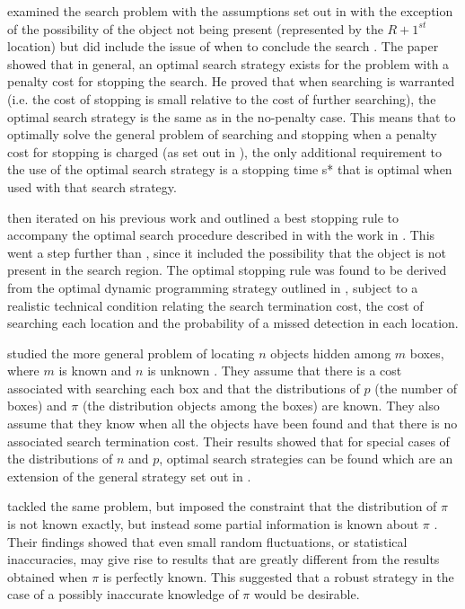 \citeauthor{Ross1969AStop} examined the search problem with the assumptions set out in \cite{Chew1966AProcedure} with the exception of the possibility of the object not being present (represented by the $R+1^{st}$ location) but did include the issue of when to conclude the search \cite{Ross1969AStop}. The paper showed that in general, an optimal search strategy exists for the problem with a penalty cost for stopping the search. He proved that when searching is warranted (i.e. the cost of stopping is small relative to the cost of further searching), the optimal search strategy is the same as in the no-penalty case. This means that to optimally solve the general problem of searching and stopping when a penalty cost for stopping is charged (as set out in \cite{Chew1966AProcedure}), the only additional requirement to the use of the optimal search strategy is a stopping time s* that is optimal when used with that search strategy.

\citeauthor{Chew1973OptimalProblem} then iterated on his previous work \cite{Chew1966AProcedure} and outlined a best stopping rule to accompany the optimal search procedure described in \cite{Chew1966AProcedure} with the work in \cite{Chew1973OptimalProblem}. This went a step further than \cite{Ross1969AStop}, since it included the possibility that the object is not present in the search region. The optimal stopping rule was found to be derived from the optimal dynamic programming strategy outlined in \cite{Chew1966AProcedure}, subject to a realistic technical condition relating the search termination cost, the cost of searching each location and the probability of a missed detection in each location.

\citeauthor{Kimeldorf1979BinomialObjects} studied the more general problem of locating $n$ objects hidden among $m$ boxes, where $m$ is known and $n$ is unknown \cite{Kimeldorf1979BinomialObjects}. They assume that there is a cost associated with searching each box and that the distributions of $p$ (the number of boxes) and $\pi$ (the distribution objects among the boxes) are known. They also assume that they know when all the objects have been found and that there is no associated search termination cost. Their results showed that for special cases of the distributions of $n$ and $p$, optimal search strategies can be found which are an extension of the general strategy set out in \cite{Blackwell1961DiscreteProgramming}.\par \citeauthor{Assaf1985OptimalApproach} tackled the same problem, but imposed the constraint that the distribution of $\pi$ is not known exactly, but instead some partial information is known about $\pi$ \cite{Assaf1985OptimalApproach}. Their findings showed that even small random fluctuations, or statistical inaccuracies, may give rise to results that are greatly different from the results obtained when $\pi$ is perfectly known. This suggested that a robust strategy in the case of a possibly inaccurate knowledge of $\pi$ would be desirable.

